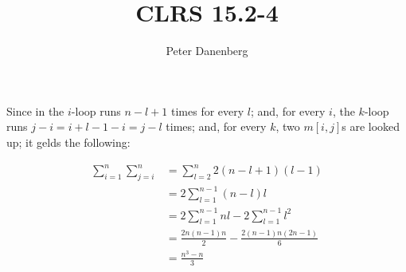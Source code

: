 \documentclass{article}
\title{CLRS 15.2-4}
\author{Peter Danenberg}
\begin{document}
\maketitle

Since in  the $i$-loop runs $n - l + 1$ times
for every $l$; and, for every $i$, the $k$-loop runs $j - i = i + l -
1 - i = j - l$ times; and, for every $k$, two $m[i,j]$s are looked up;
it gelds the following:

\begin{align}
  \sum_{i=1}^n\sum_{j=i}^n &= \sum_{l=2}^n2(n-l+1)(l-1)\\
  &= 2\sum_{l=1}^{n-1}(n-l)l\\
  &= 2\sum_{l=1}^{n-1}nl-2\sum_{l=1}^{n-1}l^2\\
  &= \frac{2n(n-1)n}{2} - \frac{2(n-1)n(2n-1)}{6}\\
  &= \frac{n^3 - n}{3}
\end{align}
\end{document}

